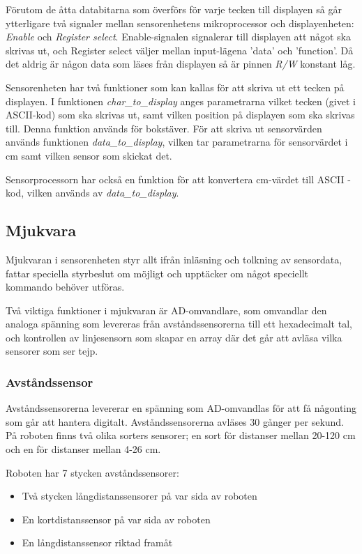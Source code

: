Förutom de åtta databitarna som överförs för varje tecken till displayen så 
går ytterligare två signaler mellan sensorenhetens mikroprocessor och 
displayenheten: \emph{Enable} och \emph{Register select}. Enable-signalen 
signalerar till displayen att något ska skrivas ut, och Register select 
väljer mellan input-lägena 'data' och 'function'. Då det aldrig är någon data 
som läses från displayen så är pinnen \emph{R/W} konstant låg. 

Sensorenheten har två funktioner som kan kallas för att skriva ut ett tecken 
på displayen. I funktionen \emph{char\_to\_display} anges parametrarna vilket 
tecken (givet i ASCII-kod) som ska skrivas ut, samt vilken position på 
displayen som ska skrivas till. Denna funktion används för bokstäver. För att 
skriva ut sensorvärden används funktionen \emph{data\_to\_display}, vilken 
tar parametrarna för sensorvärdet i cm samt vilken sensor som skickat det. 

Sensorprocessorn har också en funktion för att konvertera cm-värdet till ASCII
-kod, vilken används av \emph{data\_to\_display}.

\subsection{Mjukvara}

Mjukvaran i sensorenheten styr allt ifrån inläsning och tolkning av sensordata, fattar 
speciella styrbeslut om möjligt och upptäcker om något speciellt kommando behöver utföras.

Två viktiga funktioner i mjukvaran är AD-omvandlare, som omvandlar den analoga spänning
som levereras från avståndssensorerna till ett hexadecimalt tal, och kontrollen av linjesensorn
som skapar en array där det går att avläsa vilka sensorer som ser tejp.

\subsubsection{Avståndssensor}
Avståndssensorerna levererar en spänning som AD-omvandlas för att få någonting som går att
hantera digitalt. Avståndssensorerna avläses 30 gånger per sekund. På roboten finns två 
olika sorters sensorer; en sort för distanser mellan 20-120 cm och en för distanser mellan 4-26 cm.

Roboten har 7 stycken avståndssensorer:

\begin{itemize}
\item Två stycken långdistanssensorer på var sida av roboten
\item En kortdistanssensor på var sida av roboten
\item En långdistanssensor riktad framåt
\end{itemize} 

